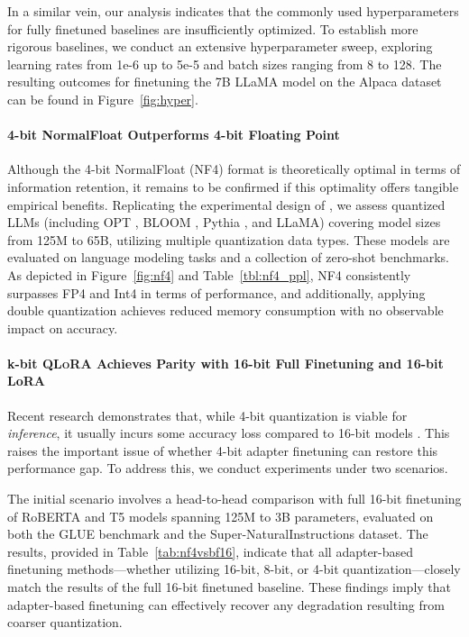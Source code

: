 In a similar vein, our analysis indicates that the commonly used hyperparameters for fully finetuned baselines are insufficiently optimized. To establish more rigorous baselines, we conduct an extensive hyperparameter sweep, exploring learning rates from 1e-6 up to 5e-5 and batch sizes ranging from 8 to 128. The resulting outcomes for finetuning the 7B LLaMA model on the Alpaca dataset can be found in Figure~\ref{fig:hyper}.

\paragraph{4-bit NormalFloat Outperforms 4-bit Floating Point} 

Although the 4-bit NormalFloat (NF4) format is theoretically optimal in terms of information retention, it remains to be confirmed if this optimality offers tangible empirical benefits. Replicating the experimental design of \citet{dettmers2022case}, we assess quantized LLMs (including OPT \citep{zhang2022opt}, BLOOM \cite{scao2022bloom}, Pythia \cite{biderman2023pythia}, and LLaMA) covering model sizes from 125M to 65B, utilizing multiple quantization data types. These models are evaluated on language modeling tasks and a collection of zero-shot benchmarks. As depicted in Figure~\ref{fig:nf4} and Table~\ref{tbl:nf4_ppl}, NF4 consistently surpasses FP4 and Int4 in terms of performance, and additionally, applying double quantization achieves reduced memory consumption with no observable impact on accuracy.

\paragraph{k-bit \textsc{QLoRA} Achieves Parity with 16-bit Full Finetuning and 16-bit LoRA} Recent research demonstrates that, while 4-bit quantization is viable for \emph{inference}, it usually incurs some accuracy loss compared to 16-bit models \citep{dettmers2022case,frantar2022gptq}. This raises the important issue of whether 4-bit adapter finetuning can restore this performance gap. To address this, we conduct experiments under two scenarios.

The initial scenario involves a head-to-head comparison with full 16-bit finetuning of RoBERTA and T5 models spanning 125M to 3B parameters, evaluated on both the GLUE benchmark and the Super-NaturalInstructions dataset. The results, provided in Table~\ref{tab:nf4vsbf16}, indicate that all adapter-based finetuning methods—whether utilizing 16-bit, 8-bit, or 4-bit quantization—closely match the results of the full 16-bit finetuned baseline. These findings imply that adapter-based finetuning can effectively recover any degradation resulting from coarser quantization.

